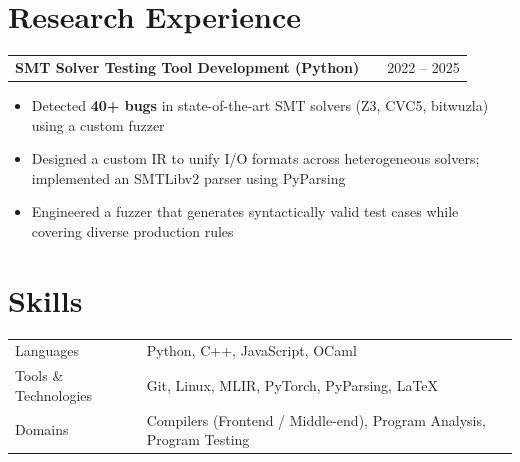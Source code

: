 \documentclass[a4paper,12pt]{article}
\makeatletter
\newenvironment{joblong}[2]
    {
    \begin{tabularx}{\linewidth}{@{}l X r@{}}
    \textbf{#1} & \hfill &  #2 \\[3.75pt]
    \end{tabularx}
    \begin{minipage}[t]{\linewidth}
    \begin{itemize}[nosep,after=\strut, leftmargin=1em, itemsep=3pt,label=--]
    }
    {
    \end{itemize}
    \end{minipage}
    }
\makeatother
\begin{document}
\vspace{6pt}

\section{Research Experience}

\begin{joblong}{SMT Solver Testing Tool Development (Python)}{2022 -- 2025}
\item Detected \textbf{40+ bugs} in state-of-the-art SMT solvers (Z3, CVC5, bitwuzla) using a custom fuzzer
\item Designed a custom IR to unify I/O formats across heterogeneous solvers; implemented an SMTLibv2 parser using PyParsing
\item Engineered a fuzzer that generates syntactically valid test cases while covering diverse production rules
\end{joblong}

\vspace{6pt}

\section{Skills}

\begin{tabularx}{\linewidth}{@{}l X@{}}
Languages & \normalsize{Python, C++, JavaScript, OCaml} \\
Tools \& Technologies & \normalsize{Git, Linux, MLIR, PyTorch, PyParsing, LaTeX} \\
Domains & \normalsize{Compilers (Frontend / Middle-end), Program Analysis, Program Testing} \\
\end{tabularx}

\vfill
\end{document}
